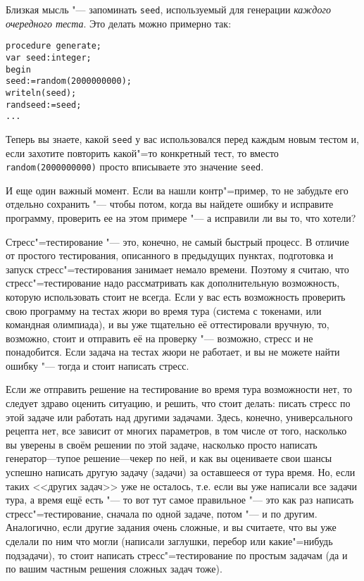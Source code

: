 Близкая мысль "--- запоминать \verb`seed`, используемый для генерации \textit{каждого очередного теста}. Это делать можно примерно так:
\begin{verbatim}
procedure generate;
var seed:integer;
begin
seed:=random(2000000000);
writeln(seed);
randseed:=seed;
...
\end{verbatim}
Теперь вы знаете, какой \verb`seed` у вас использовался перед каждым новым тестом и, если захотите повторить какой"=то конкретный тест, то 
вместо \verb`random(2000000000)` просто вписываете это значение \verb`seed`.

И еще один важный момент. Если ва нашли контр"=пример, то не забудьте его отдельно сохранить "--- чтобы потом, когда вы найдете ошибку и исправите
программу, проверить ее на этом примере "--- а исправили ли вы то, что хотели?

Стресс"=тестирование "--- это, конечно, не самый быстрый процесс. 
В отличие от простого тестирования, описанного в предыдущих пунктах, подготовка и запуск стресс"=тестирования занимает немало времени.
Поэтому я считаю, что стресс"=тестирование надо рассматривать как дополнительную возможность, которую использовать стоит не всегда.
Если у вас есть возможность проверить свою программу на тестах жюри во время тура (система с токенами, или командная олимпиада), 
и вы уже тщательно её оттестировали вручную, то, возможно, стоит и отправить её на проверку "--- возможно, стресс и не понадобится.
Если задача на тестах жюри не работает, и вы не можете найти ошибку "--- тогда и стоит написать стресс.

Если же отправить решение на тестирование во время тура возможности нет, то следует здраво оценить ситуацию, и решить, что стоит делать:
писать стресс по этой задаче или работать над другими задачами. 
Здесь, конечно, универсального рецепта нет, все зависит от многих параметров, 
в том числе от того, насколько вы уверены в своём решении по этой задаче, насколько просто написать генератор---тупое решение---чекер по ней,
и как вы оцениваете свои шансы успешно написать другую задачу (задачи) за оставшееся от тура время. 
Но, если таких <<других задач>> уже не осталось, т.е. если вы уже написали все задачи тура, а время ещё есть "--- то вот тут самое правильное "---
это как раз написать стресс"=тестирование, сначала по одной задаче, потом "--- и по другим. 
Аналогично, если другие задания очень сложные, и вы считаете, что вы уже сделали по ним что могли (написали заглушки, перебор или какие"=нибудь подзадачи),
то стоит написать стресс"=тестирование по простым задачам (да и по вашим частным решения сложных задач тоже).

